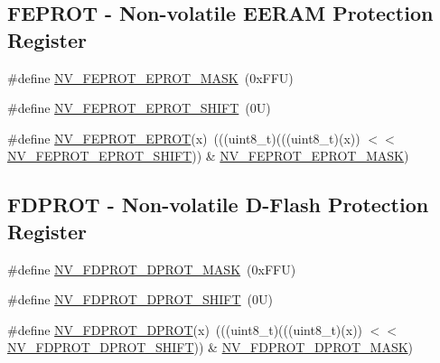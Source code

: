\subsection*{F\+E\+P\+R\+OT -\/ Non-\/volatile E\+E\+R\+AM Protection Register}
\begin{DoxyCompactItemize}
\item 
\#define \mbox{\hyperlink{group___n_v___register___masks_gae309f9fbc7ce46321fbe34e89077fd7a}{N\+V\+\_\+\+F\+E\+P\+R\+O\+T\+\_\+\+E\+P\+R\+O\+T\+\_\+\+M\+A\+SK}}~(0x\+F\+F\+U)
\item 
\#define \mbox{\hyperlink{group___n_v___register___masks_gad725c7b093dfd814cfae3e3fe8522ed2}{N\+V\+\_\+\+F\+E\+P\+R\+O\+T\+\_\+\+E\+P\+R\+O\+T\+\_\+\+S\+H\+I\+FT}}~(0\+U)
\item 
\#define \mbox{\hyperlink{group___n_v___register___masks_gaa20e7b6ed6390623af67d4ef85a3faf7}{N\+V\+\_\+\+F\+E\+P\+R\+O\+T\+\_\+\+E\+P\+R\+OT}}(x)~(((uint8\+\_\+t)(((uint8\+\_\+t)(x)) $<$$<$ \mbox{\hyperlink{group___n_v___register___masks_gad725c7b093dfd814cfae3e3fe8522ed2}{N\+V\+\_\+\+F\+E\+P\+R\+O\+T\+\_\+\+E\+P\+R\+O\+T\+\_\+\+S\+H\+I\+FT}})) \& \mbox{\hyperlink{group___n_v___register___masks_gae309f9fbc7ce46321fbe34e89077fd7a}{N\+V\+\_\+\+F\+E\+P\+R\+O\+T\+\_\+\+E\+P\+R\+O\+T\+\_\+\+M\+A\+SK}})
\end{DoxyCompactItemize}
\subsection*{F\+D\+P\+R\+OT -\/ Non-\/volatile D-\/\+Flash Protection Register}
\begin{DoxyCompactItemize}
\item 
\#define \mbox{\hyperlink{group___n_v___register___masks_ga004ff32c4f18a922a47aaf9adea14d41}{N\+V\+\_\+\+F\+D\+P\+R\+O\+T\+\_\+\+D\+P\+R\+O\+T\+\_\+\+M\+A\+SK}}~(0x\+F\+F\+U)
\item 
\#define \mbox{\hyperlink{group___n_v___register___masks_gaf2019bf7c0b8e9dc5efcc385cc50f35b}{N\+V\+\_\+\+F\+D\+P\+R\+O\+T\+\_\+\+D\+P\+R\+O\+T\+\_\+\+S\+H\+I\+FT}}~(0\+U)
\item 
\#define \mbox{\hyperlink{group___n_v___register___masks_ga47f6e3be836c5d3a4a358a2dfcca5cfe}{N\+V\+\_\+\+F\+D\+P\+R\+O\+T\+\_\+\+D\+P\+R\+OT}}(x)~(((uint8\+\_\+t)(((uint8\+\_\+t)(x)) $<$$<$ \mbox{\hyperlink{group___n_v___register___masks_gaf2019bf7c0b8e9dc5efcc385cc50f35b}{N\+V\+\_\+\+F\+D\+P\+R\+O\+T\+\_\+\+D\+P\+R\+O\+T\+\_\+\+S\+H\+I\+FT}})) \& \mbox{\hyperlink{group___n_v___register___masks_ga004ff32c4f18a922a47aaf9adea14d41}{N\+V\+\_\+\+F\+D\+P\+R\+O\+T\+\_\+\+D\+P\+R\+O\+T\+\_\+\+M\+A\+SK}})
\end{DoxyCompactItemize}


